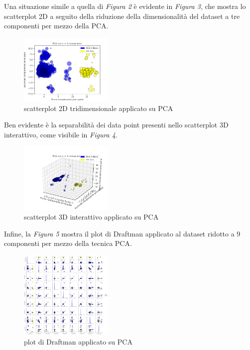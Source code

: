 \documentclass[11pt,a4paper,twocolumn]{article}
\begin{document}
 	 Una situazione simile a quella di \emph{Figura 2} è evidente in \emph{Figura 3}, che mostra lo scatterplot 2D a seguito della riduzione della dimensionalità del dataset a tre componenti per mezzo della PCA.

	\begin{figure}[h]
		\centering
		\includegraphics[width=0.4\textwidth]{img/PCA_2Dnc3.png}
		\caption{scatterplot 2D tridimensionale applicato su PCA}
	\end{figure}

	Ben evidente è la separabilità dei data point presenti nello scatterplot 3D interattivo, come visibile in \emph{Figura 4}.

	\begin{figure}[h]
		\centering
		\includegraphics[width=0.4\textwidth]{img/PCA_i3D.png}
		\caption{scatterplot 3D interattivo applicato su PCA}
	\end{figure}

	Infine, la \emph{Figura 5} mostra il plot di Draftman applicato al dataset ridotto a 9 componenti per mezzo della tecnica PCA.

	\begin{figure}[h]
		\centering
		\includegraphics[width=0.4\textwidth]{img/PCA_SPLOM.png}
		\caption{plot di Draftman applicato su PCA}
	\end{figure}
\end{document}
